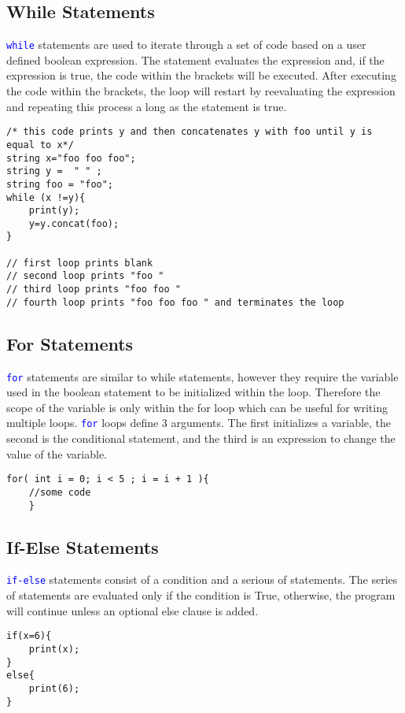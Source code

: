\documentclass[12pt]{report}
\begin{document}
\subsection{While Statements}
\textcolor{blue}{\texttt{while}} statements are used to iterate through a set of code based on a user defined boolean expression. The statement evaluates the expression and, if the expression is true, the code within the brackets will be executed. After executing the code within the brackets, the loop will restart by reevaluating the expression and repeating this process a long as the statement is true. 
\begin{lstlisting}
/* this code prints y and then concatenates y with foo until y is equal to x*/
string x="foo foo foo"; 
string y =  " " ; 
string foo = "foo"; 
while (x !=y){
	print(y);
	y=y.concat(foo);
}

// first loop prints blank
// second loop prints "foo "
// third loop prints "foo foo "
// fourth loop prints "foo foo foo " and terminates the loop
\end{lstlisting}

\subsection{For Statements}
\textcolor{blue}{\texttt{for}} statements are similar to while statements, however they require the variable used in the boolean statement to be initialized within the loop. Therefore the scope of the variable is only within the for loop which can be useful for writing multiple loops. \textcolor{blue}{\texttt{for}} loops define 3 arguments. The first initializes a variable, the second is the conditional statement, and the third is an expression to change the value of the variable.
\begin{lstlisting}
for( int i = 0; i < 5 ; i = i + 1 ){
	//some code
	}	
\end{lstlisting}

\subsection{If-Else Statements}
\textcolor{blue}{\texttt{if-else}} statements consist of a condition and a serious of statements. The series of statements are evaluated only if the condition is True, otherwise, the program will continue unless an optional else clause is added. 
\begin{lstlisting}
if(x=6){
	print(x);
}
else{
	print(6);
}
\end{lstlisting}
\end{document}
